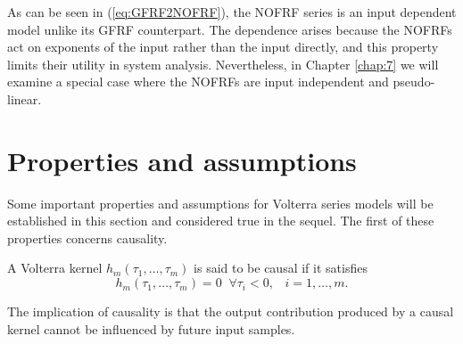 As can be seen in (\ref{eq:GFRF2NOFRF}), the NOFRF series is an input dependent model unlike its GFRF counterpart. The dependence arises because the NOFRFs act on exponents of the input rather than the input directly, and this property limits their utility in system analysis. Nevertheless, in Chapter \ref{chap:7} we will examine a special case where the NOFRFs are input independent and pseudo-linear.

\section{Properties and assumptions}
\label{sec:VolterraProperties}

Some important properties and assumptions for Volterra series models will be established in this section and considered true in the sequel. The first of these properties concerns causality.
\begin{defn}
A Volterra kernel $h_m(\tau_1, \hdots, \tau_m)$ is said to be causal if it satisfies
\begin{equation}
h_m(\tau_1, \hdots, \tau_m) = 0 \; \; \forall \tau_i < 0, \; \; \; i = 1, \hdots, m.
\end{equation}
\end{defn}
The implication of causality is that the output contribution produced by a causal kernel cannot be influenced by future input samples.

